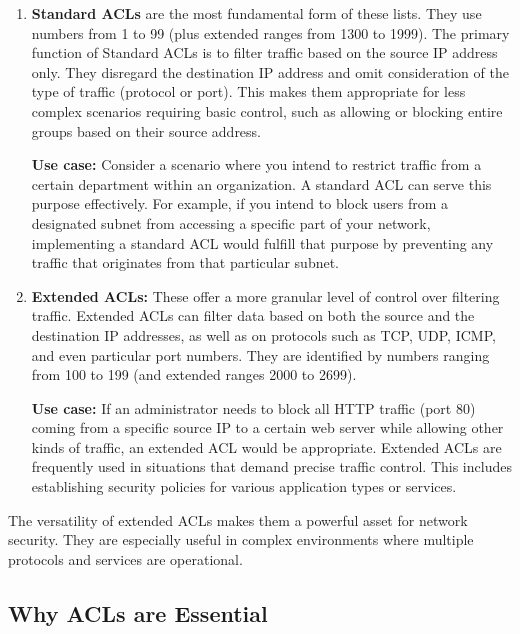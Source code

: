 \documentclass[11pt,a4paper]{article}
\begin{document}
    \begin{enumerate}
      \item \textbf{Standard ACLs} are the most fundamental form of these lists. They use numbers from 1 to 99 (plus extended ranges from 1300 to 1999). The primary function of Standard ACLs is to filter traffic based on the source IP address only. They disregard the destination IP address and omit consideration of the type of traffic (protocol or port). This makes them appropriate for less complex scenarios requiring basic control, such as allowing or blocking entire groups based on their source address.
      
      \textbf{Use case:} Consider a scenario where you intend to restrict traffic from a certain department within an organization. A standard ACL can serve this purpose effectively. For example, if you intend to block users from a designated subnet from accessing a specific part of your network, implementing a standard ACL would fulfill that purpose by preventing any traffic that originates from that particular subnet.

      \item  \textbf{Extended ACLs:} These offer a more granular level of control over filtering traffic. Extended ACLs can filter data based on both the source and the destination IP addresses, as well as on protocols such as TCP, UDP, ICMP, and even particular port numbers. They are identified by numbers ranging from 100 to 199 (and extended ranges 2000 to 2699).
    
      \textbf{Use case:} If an administrator needs to block all HTTP traffic (port 80) coming from a specific source IP to a certain web server while allowing other kinds of traffic, an extended ACL would be appropriate. Extended ACLs are frequently used in situations that demand precise traffic control. This includes establishing security policies for various application types or services.
      
    \end{enumerate}

    The versatility of extended ACLs makes them a powerful asset for network security. They are especially useful in complex environments where multiple protocols and services are operational.
    

    
    \subsection*{Why ACLs are Essential}
\end{document}
